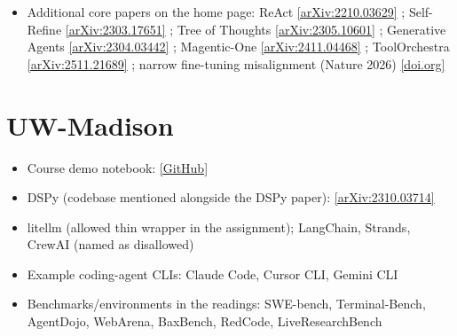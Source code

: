 \documentclass[10pt,oneside]{report}
\begin{document}
{\begin{itemize}
\item Additional core papers on the home page: ReAct \href{https://arxiv.org/abs/2210.03629}{[arXiv:2210.03629]} ; Self-Refine \href{https://arxiv.org/abs/2303.17651}{[arXiv:2303.17651]} ; Tree of Thoughts \href{https://arxiv.org/abs/2305.10601}{[arXiv:2305.10601]} ; Generative Agents \href{https://arxiv.org/abs/2304.03442}{[arXiv:2304.03442]} ; Magentic-One \href{https://arxiv.org/html/2411.04468v1}{[arXiv:2411.04468]} ; ToolOrchestra \href{https://arxiv.org/abs/2511.21689}{[arXiv:2511.21689]} ; narrow fine-tuning misalignment (Nature 2026) \href{https://doi.org/10.1038/s41586-025-09937-5}{[doi.org]}
\end{itemize}}
\section{UW-Madison}
{\small\begin{itemize}
\item Course demo notebook: \href{https://github.com/barghouthi/ai-agents/blob/main/demos/agents.ipynb}{[GitHub]}
\item DSPy (codebase mentioned alongside the DSPy paper): \href{https://arxiv.org/abs/2310.03714}{[arXiv:2310.03714]}
\item litellm (allowed thin wrapper in the assignment); LangChain, Strands, CrewAI (named as disallowed)
\item Example coding-agent CLIs: Claude Code, Cursor CLI, Gemini CLI
\item Benchmarks/environments in the readings: SWE-bench, Terminal-Bench, AgentDojo, WebArena, BaxBench, RedCode, LiveResearchBench
\end{itemize}}
\end{document}
